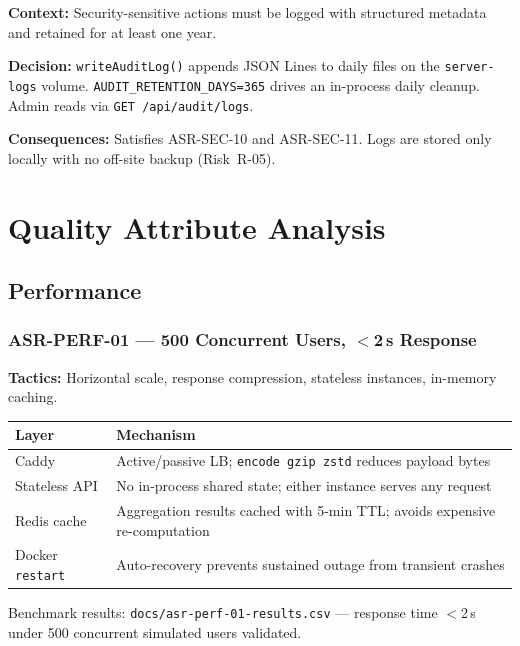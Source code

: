 \documentclass[12pt,a4paper]{article}
\begin{document}
\textbf{Context:} Security-sensitive actions must be logged with structured metadata and
retained for at least one year.

\textbf{Decision:} \texttt{writeAuditLog()} appends JSON Lines to daily files on the
\texttt{server-logs} volume. \texttt{AUDIT\_RETENTION\_DAYS=365} drives an in-process
daily cleanup. Admin reads via \texttt{GET /api/audit/logs}.

\textbf{Consequences:} Satisfies ASR-SEC-10 and ASR-SEC-11. Logs are stored only locally
with no off-site backup (Risk~R-05).

\section{Quality Attribute Analysis}
\label{sec:qa}

\subsection{Performance}

\subsubsection{ASR-PERF-01 --- 500 Concurrent Users, $<$2\,s Response}

\textbf{Tactics:} Horizontal scale, response compression, stateless instances, in-memory
caching.

\begin{tabularx}{\textwidth}{L{4cm} L{9.5cm}}
  \toprule
  \textbf{Layer} & \textbf{Mechanism} \\
  \midrule
  Caddy & Active/passive LB; \texttt{encode gzip zstd} reduces payload bytes \\
  Stateless API & No in-process shared state; either instance serves any request \\
  Redis cache & Aggregation results cached with 5-min TTL; avoids expensive re-computation \\
  Docker \texttt{restart} & Auto-recovery prevents sustained outage from transient crashes \\
  \bottomrule
\end{tabularx}

Benchmark results: \texttt{docs/asr-perf-01-results.csv} --- response time $<$2\,s under 500
concurrent simulated users validated.
\end{document}

